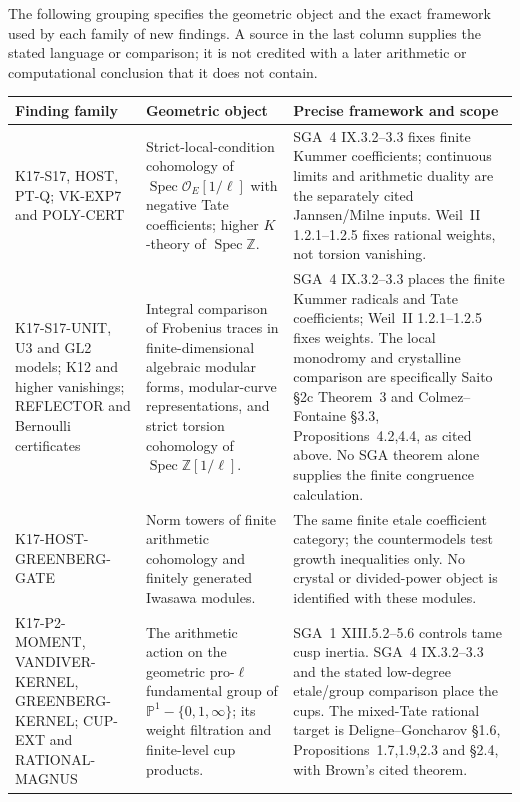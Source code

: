\documentclass[11pt,a4paper]{article}
\theoremstyle{definition}
\begin{document}
The following grouping specifies the geometric object and the exact
framework used by each family of new findings. A source in the last
column supplies the stated language or comparison; it is not credited
with a later arithmetic or computational conclusion that it does not
contain.

\small
\begin{longtable}{>{\raggedright\arraybackslash}p{}>{\raggedright\arraybackslash}p{}>{\raggedright\arraybackslash}p{}}
\toprule
Finding family & Geometric object & Precise framework and scope\\
\midrule
\endhead
K17-S17, HOST, PT-Q; VK-EXP7 and POLY-CERT &
Strict-local-condition cohomology of
$\operatorname{Spec}\mathcal O_E[1/\ell]$ with negative Tate
coefficients; higher $K$-theory of $\operatorname{Spec}\mathbb Z$. &
SGA~4 IX.3.2--3.3 fixes finite Kummer coefficients; continuous limits
and arithmetic duality are the separately cited Jannsen/Milne inputs.
Weil~II 1.2.1--1.2.5 fixes rational weights, not torsion vanishing.\\
K17-S17-UNIT, U3 and GL2 models; K12 and higher vanishings; REFLECTOR and Bernoulli certificates &
Integral comparison of Frobenius traces in finite-dimensional algebraic modular forms, modular-curve representations, and strict torsion cohomology of $\operatorname{Spec}\mathbb Z[1/\ell]$. &
SGA~4 IX.3.2--3.3 places the finite Kummer radicals and Tate coefficients; Weil~II 1.2.1--1.2.5 fixes weights. The local monodromy and crystalline comparison are specifically Saito \S2c Theorem~3 and Colmez--Fontaine \S3.3, Propositions~4.2,4.4, as cited above. No SGA theorem alone supplies the finite congruence calculation.\\
K17-HOST-GREENBERG-GATE &
Norm towers of finite arithmetic cohomology and finitely generated
Iwasawa modules. &
The same finite etale coefficient category; the countermodels test
growth inequalities only. No crystal or divided-power object is
identified with these modules.\\
K17-P2-MOMENT, VANDIVER-KERNEL, GREENBERG-KERNEL;
CUP-EXT and RATIONAL-MAGNUS &
The arithmetic action on the geometric pro-$\ell$ fundamental group
of $\mathbb P^1-\{0,1,\infty\}$; its weight filtration and
finite-level cup products. &
SGA~1 XIII.5.2--5.6 controls tame cusp inertia. SGA~4 IX.3.2--3.3
and the stated low-degree etale/group comparison place the cups.
The mixed-Tate rational target is Deligne--Goncharov \S1.6,
Propositions~1.7,1.9,2.3 and \S2.4, with Brown's cited theorem.\\

\end{longtable}
\end{document}
